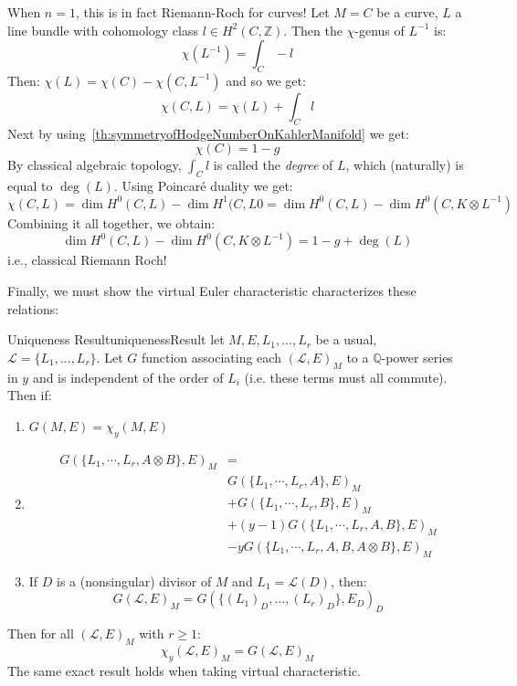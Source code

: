 \documentclass{book}
\newcommand{\Q}{{\mathbb{Q}}}
\newcommand{\Z}{{\mathbb{Z}}}
\newcommand{\CL}{{\mathcal{L}}}
\begin{document}
When $n = 1$, this is in fact Riemann-Roch for curves! Let $M = C$ be a curve, $L$ a line bundle with
cohomology class $l  \in H^2(C, \Z)$. Then the $\chi$-genus of $L^{-1}$ is:
\[
  \chi(L^{-1}) = \int_C-l
\]
Then: $\chi(L) = \chi(C) - \chi(C, L^{-1})$ and so we get:
\[
  \chi(C, L) = \chi(L) + \int_C l
\]
Next by using~\cref{th:symmetryofHodgeNumberOnKahlerManifold} we get:
\[
  \chi(C) = 1 - g
\]
By classical algebraic topology, $\int_C l$ is called the \emph{degree} of $L$, which (naturally) is equal to
$\deg(L)$. Using Poincar\'e duality we get:
\[
  \chi(C, L) = \dim H^0(C, L) - \dim H^1(C, L0 = \dim H^0(C, L) - \dim H^0(C, K\otimes L^{-1})
\]
Combining it all together, we obtain:
\[
  \dim H^0(C, L) - \dim H^0(C, K\otimes L^{-1}) = 1 - g + \deg(L)
\]
i.e., classical Riemann Roch!


Finally, we must show the virtual Euler characteristic characterizes these relations:

\begin{thm}{Uniqueness Result}{uniquenessResult}
  let $M,E, L_1, ..., L_r$ be a usual, $\CL = \{L_1, ..., L_r\}$. Let $G$ function associating each $(\CL,
  E)_M$ to a $\Q$-power series in $y$ and is independent of the order of $L_i$ (i.e. these terms must all
  commute). Then if:
  \begin{enumerate}
    \item $G(M, E) = \chi_y(M,E)$
    \item
  \begin{align*}
  G(\{L_1,\cdots,L_r,A\otimes B\},E)_M &=\\
                 &G(\{L_1,\cdots,L_r,A\},E)_M\\
                 &+ G(\{L_1,\cdots,L_r,B\},E)_M\\
                 &+ (y-1)G(\{L_1,\cdots,L_r,A,B\},E)_M\\
                 &- yG(\{L_1,\cdots,L_r,A,B,A\otimes B\},E)_M
  \end{align*}
  \item If $D$ is a (nonsingular) divisor of $M$ and $L_1 = \CL(D)$, then:
    \[
      G(\CL, E)_M = G(\{(L_1)_D, ..., (L_r)_D\}, E_D)_D
    \]
  \end{enumerate}
  Then for all $(\CL, E)_M$ with $r \ge 1$:
  \[
    \chi_y(\CL, E)_M = G(\CL, E)_M
  \]
  The same exact result holds when taking virtual characteristic.
\end{thm}
\end{document}
